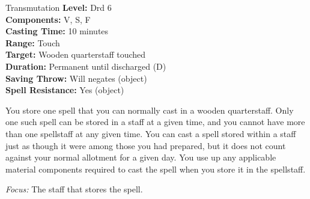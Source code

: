 {Transmutation}
{
	\textbf{Level:}
	Drd 6\\
	\textbf{Components:}
	V, S, F\\
	\textbf{Casting Time:}
	10 minutes\\
	\textbf{Range:}
	Touch\\
	\textbf{Target:}
	Wooden quarterstaff touched\\
	\textbf{Duration:}
	Permanent until discharged (D)\\
	\textbf{Saving Throw:}
	Will negates (object)\\
	\textbf{Spell Resistance:}
	Yes (object)\\
}
{
	You store one spell that you can normally cast in a wooden quarterstaff. Only one such spell can be stored in a staff at a given time, and you cannot have more than one spellstaff at any given time. You can cast a spell stored within a staff just as though it were among those you had prepared, but it does not count against your normal allotment for a given day. You use up any applicable material components required to cast the spell when you store it in the spellstaff.

	\textit{Focus:}
	The staff that stores the spell.

}
